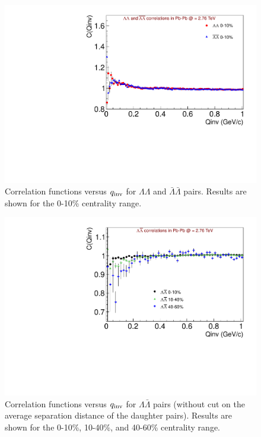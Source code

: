 \begin{figure}[hbtp]
\includegraphics[scale=0.7]{CFs_main_note.pdf}
\caption[Correlation functions versus $q_{\rm inv}$ for $\Lambda\Lambda$ and $\bar{\Lambda}\bar{\Lambda}$ pairs.]{Correlation functions versus $q_{\rm inv}$ for $\Lambda\Lambda$ and $\bar{\Lambda}\bar{\Lambda}$ pairs.  Results are shown for the 0-10\% centrality range.}
\label{fig:CF}
\end{figure}

\begin{figure}[hbtp]
\includegraphics[scale=0.7]{MixCFs_No_MergeCut.pdf}
\caption[Correlation functions versus $q_{\rm inv}$ for $\Lambda\bar{\Lambda}$ pairs in three centrality ranges. No merging cuts]{Correlation functions versus $q_{\rm inv}$ for $\Lambda\bar{\Lambda}$ pairs (without cut on the average separation distance of the daughter pairs).  Results are shown for the 0-10\%, 10-40\%, and 40-60\% centrality range.}
\label{fig:CFNoMergeMix}
\end{figure}

